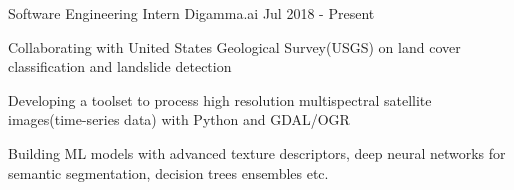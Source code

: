 
\begin{cventries}


  \cventry
    {Software Engineering Intern} %
    {Digamma.ai} %
    {} %
    {Jul 2018 - Present} %
    {
      \begin{cvitems} %
        \item {Collaborating with United States Geological Survey(USGS) on land cover classification and landslide detection}
        \item {Developing a toolset to process high resolution multispectral satellite images(time-series data) with Python and GDAL/OGR}
        \item {Building ML models with advanced texture descriptors, deep neural networks for semantic segmentation, decision trees ensembles etc.}
      \end{cvitems}
    }
\end{cventries}
